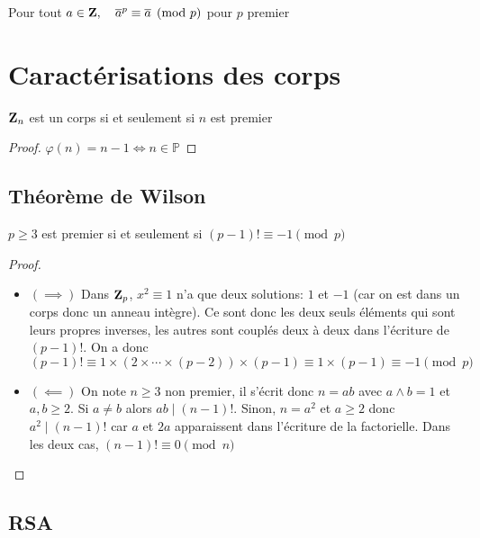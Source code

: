 \begin{cor}
     Pour tout $a\in\mathbf Z, \quad \overline{a}^p\equiv \overline{a}\pmod p$ pour $p$ premier
\end{cor}

\section{Caractérisations des corps}

\begin{prop}
    $\mathbf Z_n$ est un corps si et seulement si $n$ est premier
\end{prop}

\begin{proof}
    $\varphi(n)=n-1\iff n\in \mathbb P$
\end{proof}

\subsection{Théorème de Wilson}

\begin{res}
    $p\geq 3$ est premier si et seulement si $(p-1)!\equiv -1\pmod p$
\end{res}

\begin{proof}~
    \begin{itemize}
        \item $(\implies)$ Dans $\mathbf Z_p$, $x^2\equiv 1$ n'a que deux solutions: $1$ et $-1$ (car on est dans un corps donc un anneau intègre). Ce sont donc les deux seuls éléments qui sont leurs propres inverses, les autres sont couplés deux à deux dans l'écriture de $(p-1)!$. On a donc \[
                (p-1)!\equiv 1\times (2\times \cdots \times (p-2))\times (p-1)\equiv 1\times (p-1)\equiv -1 \pmod p
            \]
        \item $(\impliedby)$ On note $n\geq 3$ non premier, il s'écrit donc $n=ab$ avec $a\land b=1$ et $a, b\geq 2$. Si $a\neq b$ alors $ab\;|\;(n-1)!$. Sinon, $n=a^2$ et $a\geq 2$ donc $a^2\;|\;(n-1)!$ car $a$ et $2a$ apparaissent dans l'écriture de la factorielle. Dans les deux cas, $(n-1)!\equiv 0\pmod n$
    \end{itemize}
\end{proof}

\subsection{RSA}

